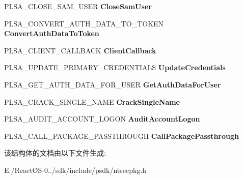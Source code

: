 \begin{DoxyCompactItemize}
P\+L\+S\+A\+\_\+\+C\+L\+O\+S\+E\+\_\+\+S\+A\+M\+\_\+\+U\+S\+ER {\bfseries Close\+Sam\+User}
\item 
\mbox{\label{struct___l_s_a___s_e_c_p_k_g___f_u_n_c_t_i_o_n___t_a_b_l_e_adec766e892eaf355dfe9b6743fb6005d}} 
P\+L\+S\+A\+\_\+\+C\+O\+N\+V\+E\+R\+T\+\_\+\+A\+U\+T\+H\+\_\+\+D\+A\+T\+A\+\_\+\+T\+O\+\_\+\+T\+O\+K\+EN {\bfseries Convert\+Auth\+Data\+To\+Token}
\item 
\mbox{\label{struct___l_s_a___s_e_c_p_k_g___f_u_n_c_t_i_o_n___t_a_b_l_e_adbd4ab87d3a18d1e3b7d75799db78a4b}} 
P\+L\+S\+A\+\_\+\+C\+L\+I\+E\+N\+T\+\_\+\+C\+A\+L\+L\+B\+A\+CK {\bfseries Client\+Callback}
\item 
\mbox{\label{struct___l_s_a___s_e_c_p_k_g___f_u_n_c_t_i_o_n___t_a_b_l_e_ac43c16662caec3e7bf279347a0e9e14c}} 
P\+L\+S\+A\+\_\+\+U\+P\+D\+A\+T\+E\+\_\+\+P\+R\+I\+M\+A\+R\+Y\+\_\+\+C\+R\+E\+D\+E\+N\+T\+I\+A\+LS {\bfseries Update\+Credentials}
\item 
\mbox{\label{struct___l_s_a___s_e_c_p_k_g___f_u_n_c_t_i_o_n___t_a_b_l_e_a3925f6231fa6fd1f13a796448e12f19b}} 
P\+L\+S\+A\+\_\+\+G\+E\+T\+\_\+\+A\+U\+T\+H\+\_\+\+D\+A\+T\+A\+\_\+\+F\+O\+R\+\_\+\+U\+S\+ER {\bfseries Get\+Auth\+Data\+For\+User}
\item 
\mbox{\label{struct___l_s_a___s_e_c_p_k_g___f_u_n_c_t_i_o_n___t_a_b_l_e_a30eb9dcf793cf644cba7db860d15b2f8}} 
P\+L\+S\+A\+\_\+\+C\+R\+A\+C\+K\+\_\+\+S\+I\+N\+G\+L\+E\+\_\+\+N\+A\+ME {\bfseries Crack\+Single\+Name}
\item 
\mbox{\label{struct___l_s_a___s_e_c_p_k_g___f_u_n_c_t_i_o_n___t_a_b_l_e_a97cb547d21b4781cd73e6bf84213c10a}} 
P\+L\+S\+A\+\_\+\+A\+U\+D\+I\+T\+\_\+\+A\+C\+C\+O\+U\+N\+T\+\_\+\+L\+O\+G\+ON {\bfseries Audit\+Account\+Logon}
\item 
\mbox{\label{struct___l_s_a___s_e_c_p_k_g___f_u_n_c_t_i_o_n___t_a_b_l_e_a10d75360d7ae4e394101c4e2bc49c5fb}} 
P\+L\+S\+A\+\_\+\+C\+A\+L\+L\+\_\+\+P\+A\+C\+K\+A\+G\+E\+\_\+\+P\+A\+S\+S\+T\+H\+R\+O\+U\+GH {\bfseries Call\+Package\+Passthrough}
\end{DoxyCompactItemize}


该结构体的文档由以下文件生成\+:\begin{DoxyCompactItemize}
\item 
E\+:/\+React\+O\+S-\/0../sdk/include/psdk/ntsecpkg.\+h\end{DoxyCompactItemize}
